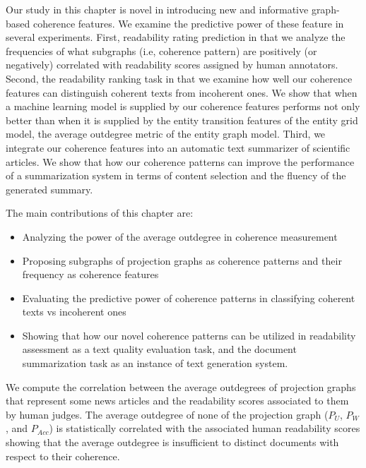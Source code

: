 Our study in this chapter is novel in introducing new and informative graph-based coherence features. 
We examine the predictive power of these feature in several experiments.  
First, readability rating prediction in that we analyze the frequencies of what subgraphs (i.e, coherence pattern) are positively (or negatively) correlated with readability scores assigned by human annotators. 
Second, the readability ranking task in that we examine how well our coherence features can distinguish coherent texts from incoherent ones. 
We show that when a machine learning model is supplied by our coherence features performs not only better than when it is supplied by the entity transition features of the entity grid model, the average outdegree metric of the entity graph model. 
Third, we integrate our coherence features into an automatic text summarizer of scientific articles. 
We show that how our coherence patterns can improve the performance of a summarization system in terms of content selection and  the fluency of the generated summary. 

The main contributions of this chapter are:

\begin{itemize}
\item Analyzing the power of the average outdegree in coherence measurement
\item Proposing subgraphs of projection graphs as coherence patterns and their frequency as coherence features 
\item Evaluating the predictive power of coherence patterns in classifying coherent texts vs incoherent ones
\item Showing that how our novel coherence patterns can be utilized in readability assessment as a text quality evaluation task, and the document summarization task as an instance of text generation system.   
\end{itemize}
 
We compute the correlation between the average outdegrees of projection graphs that represent some news articles and the readability scores associated to them by human judges. 
The average outdegree of none of the projection graph ($P_U$, $P_W$, and $P_{Acc}$) is statistically correlated with the associated human readability scores showing that the average outdegree is insufficient to distinct documents with respect to their coherence. 



